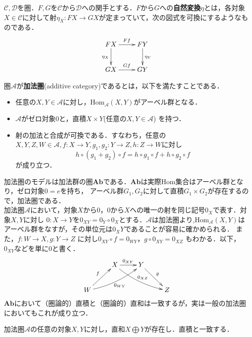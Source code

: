 
\begin{defi}
$\mathcal{C},\mathcal{D}$を圏．$F,G$を$\mathcal{C}$から$\mathcal{D}$への関手とする．$F$から$G$への{\bf 自然変換}$\eta$とは，各対象$X \in \mathcal{C}$に対して射$\eta_X : FX \to GX $が定まっていて，次の図式を可換にするようなものである．
\[ 
\xymatrix {
	FX	\ar[r]^{Ff} \ar[d]_{\eta_X}	& FY \ar[d]^{\eta_Y} \\
	GX	\ar[r]^{Gf} 				& GY
}
\]
\end{defi} \proofend

\begin{defi}
圏$\mathcal{A}$が{\bf 加法圏}(additive category)であるとは，以下を満たすことである．
\begin{itemize}
\item 任意の$X,Y \in \mathcal{A}$に対し，$\mathrm{Hom}_\mathcal{A}(X,Y)$がアーベル群となる．
\item $\mathcal{A}$がゼロ対象$0$と，直積$X \times Y$(任意の$X,Y \in \mathcal{A}$) を持つ．
\item 射の加法と合成が可換である．すなわち，任意の$X,Y,Z,W \in \mathcal{A},f:X \to Y, g_1,g_2:Y \to Z, h:Z \to W$に対し
\[
h\circ(g_1 + g_2) \circ f = h \circ g_1 \circ f + h \circ g_2 \circ f
\]
が成り立つ．
\end{itemize}
\end{defi} \proofend
加法圏のモデルは加法群の圏$\mathbf{Ab}$である．$\mathbf{Ab}$は実際Hom集合はアーベル群となり，ゼロ対象$0 = {e}$を持ち，
アーベル群$G_1,G_2$に対して直積$G_1 \times G_2 $が存在するので，加法圏である．\\
加法圏$\mathcal{A}$において，対象$X$から$0$，$0$から$X$への唯一の射を同じ記号$0_X$で表す．対象$X,Y$に対し
$0 : X \to Y$を$0_{XY} = 0_Y \circ 0_X$とする．$\mathcal{A}$は加法圏より,$\mathrm{Hom}_\mathcal{A}(X,Y)$はアーベル群をなすが，その単位元は$0_XY$であることが容易に確かめられる． また，$f:W \to X , g:Y\to Z$ に対し$0_{XY} \circ f = 0_{WY} ，
g \circ 0_{XY} = 0_{XZ}$ もわかる．以下，$0_{XY}$などを単に0と書く．
\[
\xymatrix{
&	X \ar[r]^{0_{XY}} \ar@/_/[rrd]^{0_{XZ}}& Y \ar[dr]^{g} \\
W  \ar[ur]^f \ar@/_/[urr]_{0_{WY}}&&&Z
}
\]
$\mathbf{Ab}$において（圏論的）直積と（圏論的）直和は一致するが，実は一般の加法圏においてもこれが成り立つ．
\begin{prop}
加法圏$\mathcal{A}$の任意の対象$X,Y$に対し，直和$X \bigoplus Y$が存在し．直積と一致する．
\end{prop}
